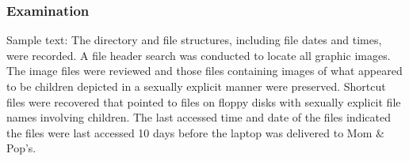 \subsubsection{Examination}

Sample text:
The directory and file structures, including file dates and times, were recorded. A file header search was conducted to locate all graphic images. The image files were reviewed and those files containing images of what appeared to be children depicted in a sexually explicit manner were preserved. Shortcut files were recovered that pointed to files on floppy disks with sexually explicit file names involving children. The last accessed time and date of the files indicated the files were last accessed 10 days before the laptop was delivered to Mom \& Pop's.